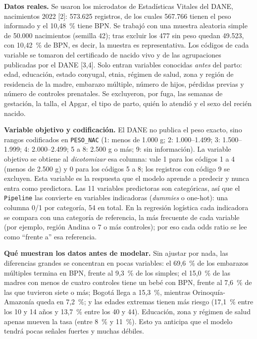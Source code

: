 \documentclass[11pt,a4paper]{article}
\newcommand{\cita}[1]{[#1]}
\begin{document}
\textbf{Datos reales.} Se usaron los microdatos de Estadísticas Vitales del DANE, nacimientos 2022 \cita{2}: 573.625 registros, de los cuales 567.766 tienen el peso informado y el 10,48~\% tiene BPN. Se trabajó con una muestra aleatoria simple de 50.000 nacimientos (semilla 42); tras excluir los 477 sin peso quedan 49.523, con 10,42~\% de BPN, es decir, la muestra es representativa. Los códigos de cada variable se tomaron del certificado de nacido vivo y de las agrupaciones publicadas por el DANE \cita{3,4}. Solo entran variables conocidas \emph{antes} del parto: edad, educación, estado conyugal, etnia, régimen de salud, zona y región de residencia de la madre, embarazo múltiple, número de hijos, pérdidas previas y número de controles prenatales. Se excluyeron, por fuga, las semanas de gestación, la talla, el Apgar, el tipo de parto, quién lo atendió y el sexo del recién nacido.

\textbf{Variable objetivo y codificación.} El DANE no publica el peso exacto, sino rangos codificados en \texttt{PESO\_NAC} (1: menos de 1.000 g; 2: 1.000--1.499; 3: 1.500--1.999; 4: 2.000--2.499; 5 a 8: 2.500 g o más; 9: sin información). La variable objetivo se obtiene al \emph{dicotomizar} esa columna: vale 1 para los códigos 1 a 4 (menos de 2.500 g) y 0 para los códigos 5 a 8; los registros con código 9 se excluyen. Esta variable es la respuesta que el modelo aprende a predecir y nunca entra como predictora. Las 11 variables predictoras son categóricas, así que el \texttt{Pipeline} las convierte en variables indicadoras (\emph{dummies} o one-hot): una columna 0/1 por categoría, 54 en total. En la regresión logística cada indicadora se compara con una categoría de referencia, la más frecuente de cada variable (por ejemplo, región Andina o 7 o más controles); por eso cada odds ratio se lee como ``frente a'' esa referencia.

\textbf{Qué muestran los datos antes de modelar.} Sin ajustar por nada, las diferencias grandes se concentran en pocas variables: el 69,6~\% de los embarazos múltiples termina en BPN, frente al 9,3~\% de los simples; el 15,0~\% de las madres con menos de cuatro controles tiene un bebé con BPN, frente al 7,6~\% de las que tuvieron siete o más; Bogotá llega a 15,3~\%, mientras Orinoquía-Amazonía queda en 7,2~\%; y las edades extremas tienen más riesgo (17,1~\% entre los 10 y 14 años y 13,7~\% entre los 40 y 44). Educación, zona y régimen de salud apenas mueven la tasa (entre 8~\% y 11~\%). Esto ya anticipa que el modelo tendrá pocas señales fuertes y muchas débiles.
\end{document}
